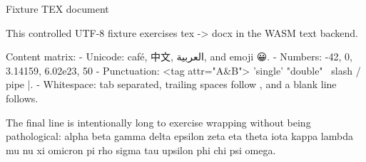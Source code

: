 Fixture TEX document

This controlled UTF-8 fixture exercises tex -> docx in the WASM text backend.

Content matrix:
- Unicode: café, 中文, العربية, and emoji 😀.
- Numbers: -42, 0, 3.14159, 6.02e23, 50%
- Punctuation: <tag attr="A&B"> 'single' "double" \ slash / pipe |.
- Whitespace: tab	separated, trailing spaces follow  , and a blank line follows.

The final line is intentionally long to exercise wrapping without being pathological: alpha beta gamma delta epsilon zeta eta theta iota kappa lambda mu nu xi omicron pi rho sigma tau upsilon phi chi psi omega.
